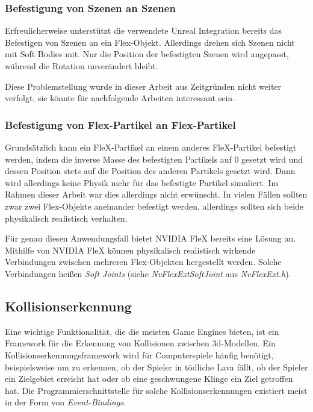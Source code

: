 
\subsubsection{Befestigung von Szenen an Szenen}

Erfreulicherweise unterstützt die verwendete Unreal Integration bereits das Befestigen von Szenen an ein Flex-Objekt. Allerdings drehen sich Szenen nicht mit Soft Bodies mit. Nur die Position der befestigten Szenen wird angepasst, während die Rotation unverändert bleibt. 


Diese Problemstellung wurde in dieser Arbeit aus Zeitgründen nicht weiter verfolgt, sie könnte für nachfolgende Arbeiten interessant sein.

\subsubsection{Befestigung von Flex-Partikel an Flex-Partikel}

Grundsätzlich kann ein FleX-Partikel an einem anderes FleX-Partikel befestigt werden, indem die inverse Masse des befestigten Partikels auf 0 gesetzt wird und dessen Position stets auf die Position des anderen Partikels gesetzt wird. 
Dann wird allerdings keine Physik mehr für das befestigte Partikel simuliert. %
Im Rahmen dieser Arbeit war dies allerdings nicht erwünscht. In vielen Fällen sollten zwar zwei Flex-Objekte aneinander befestigt werden, allerdings sollten sich beide physikalisch realistisch verhalten. 

Für genau diesen Anwendungsfall bietet NVIDIA FleX bereits eine Lösung an. Mithilfe von NVIDIA FleX können physikalisch realistisch wirkende Verbindungen zwischen mehreren Flex-Objekten hergestellt werden. Solche Verbindungen heißen \textit{Soft Joints} (siehe \textit{NvFlexExtSoftJoint} aus \textit{NvFlexExt.h}).

\subsection{Kollisionserkennung}


Eine wichtige Funktionalität, die die meisten Game Engines bieten, ist ein Framework für die Erkennung von Kollisionen zwischen 3d-Modellen. 
Ein Kollisionserkennungsframework wird für Computerspiele häufig benötigt, beispielsweise um zu erkennen, ob der Spieler in tödliche Lava fällt, ob der Spieler ein Zielgebiet erreicht hat oder ob eine geschwungene Klinge ein Ziel getroffen hat. Die Programmierschnittstelle für solche Kollisionserkennungen existiert meist in der Form von \textit{Event-Bindings}. 

